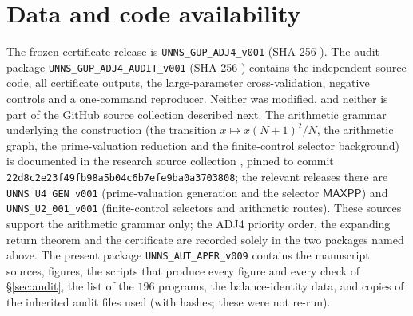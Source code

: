 \documentclass[11pt,a4paper]{article}
\theoremstyle{definition}
\begin{document}
\section{Data and code availability}
The frozen certificate release is \texttt{UNNS\_GUP\_ADJ4\_v001} (SHA-256 \texttt{}). The audit package \texttt{UNNS\_GUP\_ADJ4\_AUDIT\_v001} (SHA-256 \texttt{}) contains the independent source code, all certificate outputs, the large-parameter cross-validation, negative controls and a one-command reproducer. Neither was modified, and neither is part of the GitHub source collection described next. The arithmetic grammar underlying the construction (the transition $x\mapsto x(N+1)^2/N$, the arithmetic graph, the prime-valuation reduction and the finite-control selector background) is documented in the research source collection \cite{ad-collection}, pinned to commit \texttt{22d8c2e23f49fb98a5b04c6b7efe9ba0a3703808}; the relevant releases there are \texttt{UNNS\_U4\_GEN\_v001} \cite{u4gen} (prime-valuation generation and the selector $\textsf{MAXPP}$) and \texttt{UNNS\_U2\_001\_v001} \cite{u2001} (finite-control selectors and arithmetic routes). These sources support the arithmetic grammar only; the ADJ4 priority order, the expanding return theorem and the certificate are recorded solely in the two packages named above. The present package \texttt{UNNS\_AUT\_APER\_v009} contains the manuscript sources, figures, the scripts that produce every figure and every check of \S\ref{sec:audit}, the list of the $196$ programs, the balance-identity data, and copies of the inherited audit files used (with hashes; these were not re-run).
\end{document}
